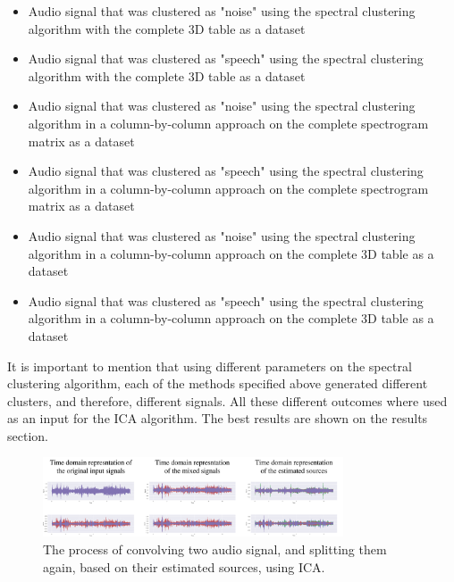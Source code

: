 \documentclass[10pt,twocolumn]{article}
\begin{document}
\begin{enumerate}
\begin{itemize}
\begin{itemize}
          \item Audio signal that was clustered as "noise" using the spectral clustering algorithm with the complete 3D table as a dataset
          \item Audio signal that was clustered as "speech" using the spectral clustering algorithm with the complete 3D table as a dataset
          \item Audio signal that was clustered as "noise" using the spectral clustering algorithm in a column-by-column approach on the complete spectrogram matrix as a dataset
          \item Audio signal that was clustered as "speech" using the spectral clustering algorithm in a column-by-column approach on the complete spectrogram matrix as a dataset
          \item Audio signal that was clustered as "noise" using the spectral clustering algorithm in a column-by-column approach on the complete 3D table as a dataset
          \item Audio signal that was clustered as "speech" using the spectral clustering algorithm in a column-by-column approach on the complete 3D table as a dataset
        \end{itemize}
        It is important to mention that using different parameters on the spectral clustering algorithm, each of the methods specified above generated different clusters, and therefore, different signals. All these different outcomes where used as an input for the ICA algorithm. The best results are shown on the results section.
        \begin{figure}[!h]
          \begin{center}
            \includegraphics[width=3.5in]{images/05.png}
          \end{center}
          \caption{The process of convolving two audio signal, and splitting them again, based on their estimated sources, using ICA.}
          \label{ica}
        \end{figure}
    \end{itemize}


\end{enumerate}
\end{document}
